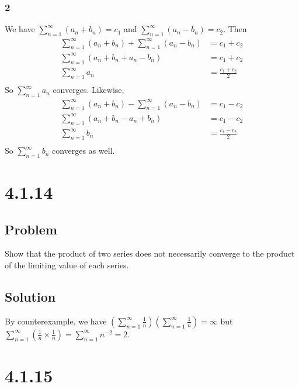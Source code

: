 \documentclass[12pt]{article}
\newcommand{\round}[1]{\left(       #1 \right)      }
\begin{document}
\subsubsection*{2}
We have $\sum_{n=1}^\infty (a_n + b_n) = c_1$ and $\sum_{n=1}^\infty (a_n - b_n) = c_2$. Then
\begin{align*}
    \sum_{n=1}^\infty (a_n + b_n) + \sum_{n=1}^\infty (a_n - b_n) &= c_1 + c_2 \\
    \sum_{n=1}^\infty (a_n + b_n + a_n - b_n) &= c_1 + c_2 \\
    \sum_{n=1}^\infty a_n &= \frac{c_1 + c_2}{2} \\
\end{align*}
So $\sum_{n=1}^\infty a_n$ converges. Likewise,
\begin{align*}
    \sum_{n=1}^\infty (a_n + b_n) - \sum_{n=1}^\infty (a_n - b_n) &= c_1 - c_2 \\
    \sum_{n=1}^\infty (a_n + b_n - a_n + b_n) &= c_1 - c_2 \\
    \sum_{n=1}^\infty b_n &= \frac{c_1 - c_2}{2} \\
\end{align*}
So $\sum_{n=1}^\infty b_n$ converges as well.



\section*{4.1.14}

\subsection*{Problem}
Show that the product of two series does not necessarily converge to the product of the limiting value of each series.

\subsection*{Solution}
By counterexample, we have $\round{\sum_{n=1}^\infty \frac{1}{n}} \round{\sum_{n=1}^\infty \frac{1}{n}} = \infty$ but $\sum_{n=1}^\infty \round{\frac{1}{n} \times \frac{1}{n}} = \sum_{n=1}^\infty n^{-2} = 2$.



\section*{4.1.15}
\end{document}
